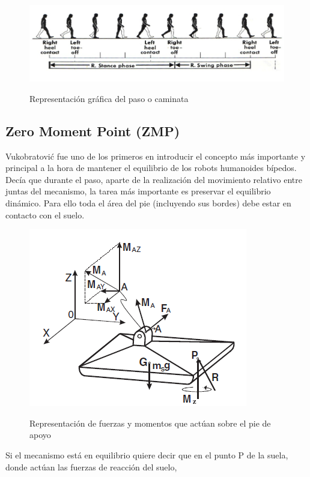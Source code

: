 \begin{figure}[H]
\centering
{\includegraphics[scale=0.6]{imagenes/apartado_2/221_ciclo_paso_humano}}
\caption{Representación gráfica del paso o caminata}
\label{figura221}
\end{figure}

\newpage

\subsection{Zero Moment Point (ZMP)}

Vukobratović \cite{ref16} fue uno de los primeros en introducir el concepto más importante y principal a la hora de mantener el equilibrio de los robots humanoides bípedos. Decía que durante el paso, aparte de la realización del movimiento relativo entre juntas del mecanismo, la tarea más importante es preservar el equilibrio dinámico. Para ello toda el área del pie (incluyendo sus bordes) debe estar en contacto con el suelo.

\begin{figure}[H]
\centering
{\includegraphics[scale=0.6]{imagenes/apartado_2/222_fuerzas_momentos}}
\caption{Representación de fuerzas y momentos que actúan sobre el pie de apoyo}
\label{figura222}
\end{figure}

Si el mecanismo está en equilibrio quiere decir que en el punto P de la suela, donde actúan las fuerzas de reacción del suelo,

